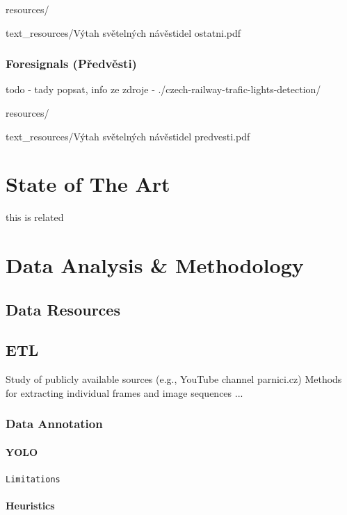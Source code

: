 \documentclass[english, ing, kiv, he, iso690alph, pdf, viewonly]{fasthesis}
\begin{document}
resources/

text\_resources/Výtah světelných návěstidel ostatni.pdf 



\newpage
\subsection{Foresignals (Předvěsti)}
todo - tady popsat, info ze zdroje - ./czech-railway-trafic-lights-detection/

resources/

text\_resources/Výtah světelných návěstidel predvesti.pdf 



\chapter{State of The Art}
this is related\cite{Staino2022}



\chapter{Data Analysis \& Methodology}

\section{Data Resources}

\newpage
\section{ETL}


Study of publicly available sources (e.g., YouTube channel parnici.cz)
Methods for extracting individual frames and image sequences ... \cite{lin2015microsoft}

\subsection{Data Annotation}
\subsubsection{YOLO}

\texttt{Limitations}


\subsubsection{Heuristics}
\end{document}
